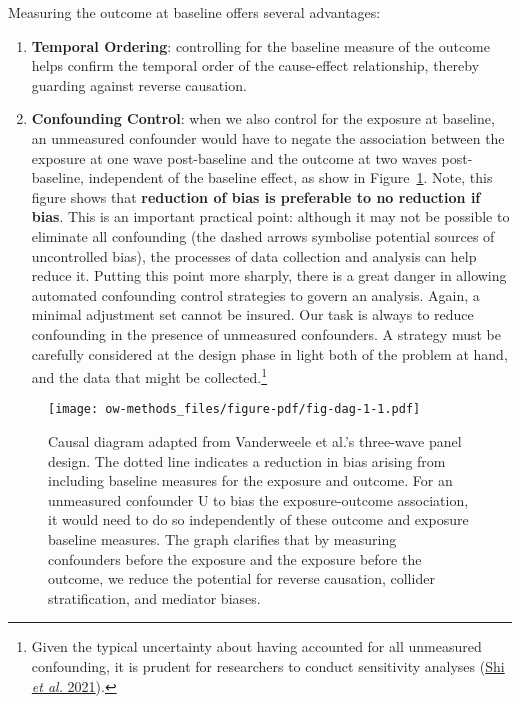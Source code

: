 \documentclass[
  singlecolumn]{article}
\begin{document}
Measuring the outcome at baseline offers several advantages:

\begin{enumerate}
\def\labelenumi{\alph{enumi}.}
\item
  \textbf{Temporal Ordering}: controlling for the baseline measure of
  the outcome helps confirm the temporal order of the cause-effect
  relationship, thereby guarding against reverse causation.
\item
  \textbf{Confounding Control}: when we also control for the exposure at
  baseline, an unmeasured confounder would have to negate the
  association between the exposure at one wave post-baseline and the
  outcome at two waves post-baseline, independent of the baseline
  effect, as show in Figure~\ref{fig-dag-1}. Note, this figure shows
  that \textbf{reduction of bias is preferable to no reduction if bias}.
  This is an important practical point: although it may not be possible
  to eliminate all confounding (the dashed arrows symbolise potential
  sources of uncontrolled bias), the processes of data collection and
  analysis can help reduce it. Putting this point more sharply, there is
  a great danger in allowing automated confounding control strategies to
  govern an analysis. Again, a minimal adjustment set cannot be insured.
  Our task is always to reduce confounding in the presence of unmeasured
  confounders. A strategy must be carefully considered at the design
  phase in light both of the problem at hand, and the data that might be
  collected.\footnote{Given the typical uncertainty about having
    accounted for all unmeasured confounding, it is prudent for
    researchers to conduct sensitivity analyses
    (\hyperref[ref-shi2021]{Shi \emph{et al.} 2021}).}
\end{enumerate}

\begin{figure}

{\centering \texttt{[image: ow-methods\_files/figure-pdf/fig-dag-1-1.pdf]}

}

\caption{\label{fig-dag-1}Causal diagram adapted from Vanderweele et
al.'s three-wave panel design. The dotted line indicates a reduction in
bias arising from including baseline measures for the exposure and
outcome. For an unmeasured confounder U to bias the exposure-outcome
association, it would need to do so independently of these outcome and
exposure baseline measures. The graph clarifies that by measuring
confounders before the exposure and the exposure before the outcome, we
reduce the potential for reverse causation, collider stratification, and
mediator biases.}

\end{figure}
\end{document}
